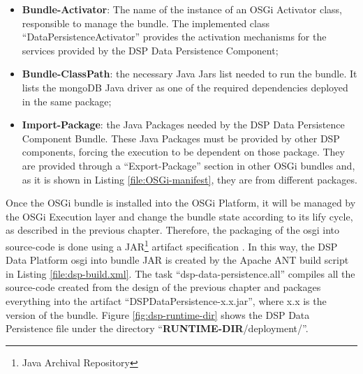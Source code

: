 \begin{itemize}
  \item \textbf{Bundle-Activator}: The name of the instance of an OSGi
  Activator class, responsible to manage the bundle. The implemented class
  ``DataPersistenceActivator'' provides the activation mechanisms for the
  services provided by the DSP Data Persistence Component;
  \item \textbf{Bundle-ClassPath}: the necessary Java Jars list needed to run
  the bundle. It lists the mongoDB Java driver as one of the required
  dependencies deployed in the same package;
  \item \textbf{Import-Package}: the Java Packages needed by the DSP Data
  Persistence Component Bundle. These Java Packages must be provided by other
  DSP components, forcing the execution to be dependent on those package.
  They are provided through a ``Export-Package'' section in other OSGi
  bundles and, as it is shown in Listing \ref{file:OSGi-manifest}, they
  are from different packages.
\end{itemize}

Once the OSGi bundle is installed into the OSGi Platform, it will be managed by
the OSGi Execution layer and change the bundle state according to its lify
cycle, as described in the previous chapter. Therefore, the packaging of the
osgi into source-code is done using a JAR\footnote{Java Archival Repository}
artifact specification \cite{java-tutorial}. In this way, the DSP Data
Platform osgi into bundle JAR is created by the Apache ANT build script
\cite{apache-ant} in Listing \ref{file:dsp-build.xml}. The task 
``dsp-data-persistence.all'' compiles all the source-code created from the
design of the previous chapter and packages everything into the artifact
``DSPDataPersistence-x.x.jar'', where x.x is the version of the bundle. Figure
\ref{fig:dsp-runtime-dir} shows the DSP Data Persistence file under the
directory ``\textbf{RUNTIME-DIR}/deployment/''.

